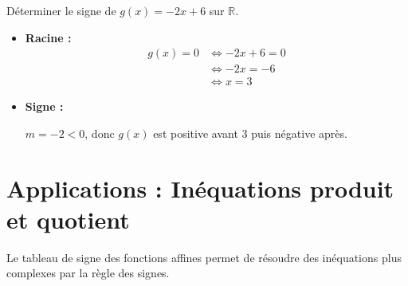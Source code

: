 \begin{meth}
	Déterminer le signe de $g(x) = -2x + 6$ sur $\mathbb{R}$.
	\begin{correction}
		\nline
		\begin{itemize}
			\item \textbf{Racine :}
			      \begin{align*}
				      g(x) = 0 & \iff -2x + 6 = 0 \\
				               & \iff -2x = -6    \\
				               & \iff x = 3
			      \end{align*}
			\item \textbf{Signe :}

			      $m = -2 < 0$, donc $g(x)$ est positive avant 3 puis négative après.
		\end{itemize}
		\begin{center}
		\end{center}
	\end{correction}
\end{meth}

\newpage

\section{Applications : Inéquations produit et quotient}

Le tableau de signe des fonctions affines permet de résoudre des inéquations plus complexes par la règle des signes.

